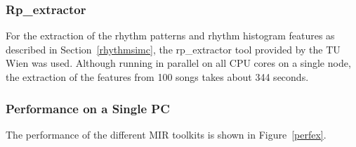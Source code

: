 \subsubsection{Rp\_extractor}

For the extraction of the rhythm patterns and rhythm histogram features as described in Section~\ref{rhythmsimc}, the rp\_extractor tool provided by the TU Wien was used. Although running in parallel on all CPU cores on a single node, the extraction of the features from 100 songs takes about 344 seconds.

\subsubsection{Performance on a Single PC}

The performance of the different MIR toolkits is shown in Figure~\ref{perfex}. 

